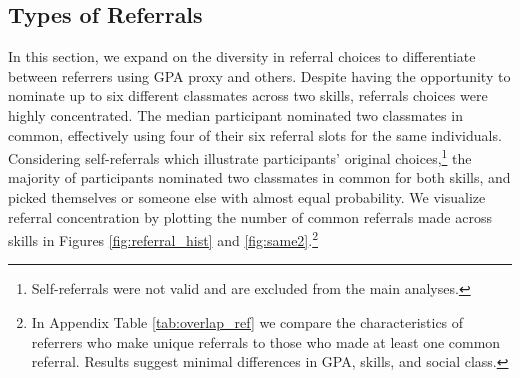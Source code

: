 \documentclass[11pt,a4paper,oneside]{article}
\begin{document}
\subsection{Types of Referrals}
In this section, we expand on the diversity in referral choices to differentiate between referrers using GPA proxy and others. Despite having the opportunity to nominate up to six different classmates across two skills, referrals choices were highly concentrated. The median participant nominated two classmates in common, effectively using four of their six referral slots for the same individuals. Considering self-referrals which illustrate participants' original choices,\footnote{Self-referrals were not valid and are excluded from the main analyses.} the majority of participants nominated two classmates in common for both skills, and picked themselves or someone else with almost equal probability. We visualize referral concentration by plotting the number of common referrals made across skills in Figures \ref{fig:referral_hist} and \ref{fig:same2}.\footnote{In Appendix Table \ref{tab:overlap_ref} we compare the characteristics of referrers who make unique referrals to those who made at least one common referral. Results suggest minimal differences in GPA, skills, and social class.}

\end{document}
